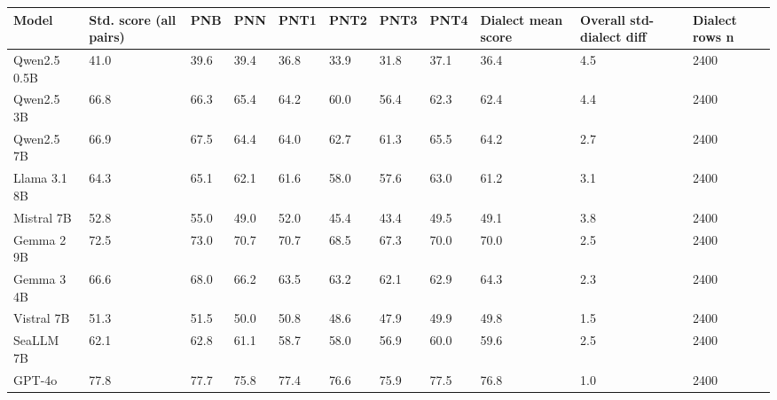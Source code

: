 \begin{tabular}{lllllllllll}
\toprule
       Model & Std. score (all pairs) &  PNB &  PNN & PNT1 & PNT2 & PNT3 & PNT4 & Dialect mean score & Overall std-dialect diff & Dialect rows n \\
\midrule
Qwen2.5 0.5B &                   41.0 & 39.6 & 39.4 & 36.8 & 33.9 & 31.8 & 37.1 &               36.4 &                      4.5 &           2400 \\
  Qwen2.5 3B &                   66.8 & 66.3 & 65.4 & 64.2 & 60.0 & 56.4 & 62.3 &               62.4 &                      4.4 &           2400 \\
  Qwen2.5 7B &                   66.9 & 67.5 & 64.4 & 64.0 & 62.7 & 61.3 & 65.5 &               64.2 &                      2.7 &           2400 \\
Llama 3.1 8B &                   64.3 & 65.1 & 62.1 & 61.6 & 58.0 & 57.6 & 63.0 &               61.2 &                      3.1 &           2400 \\
  Mistral 7B &                   52.8 & 55.0 & 49.0 & 52.0 & 45.4 & 43.4 & 49.5 &               49.1 &                      3.8 &           2400 \\
  Gemma 2 9B &                   72.5 & 73.0 & 70.7 & 70.7 & 68.5 & 67.3 & 70.0 &               70.0 &                      2.5 &           2400 \\
  Gemma 3 4B &                   66.6 & 68.0 & 66.2 & 63.5 & 63.2 & 62.1 & 62.9 &               64.3 &                      2.3 &           2400 \\
  Vistral 7B &                   51.3 & 51.5 & 50.0 & 50.8 & 48.6 & 47.9 & 49.9 &               49.8 &                      1.5 &           2400 \\
   SeaLLM 7B &                   62.1 & 62.8 & 61.1 & 58.7 & 58.0 & 56.9 & 60.0 &               59.6 &                      2.5 &           2400 \\
      GPT-4o &                   77.8 & 77.7 & 75.8 & 77.4 & 76.6 & 75.9 & 77.5 &               76.8 &                      1.0 &           2400 \\
\bottomrule
\end{tabular}

